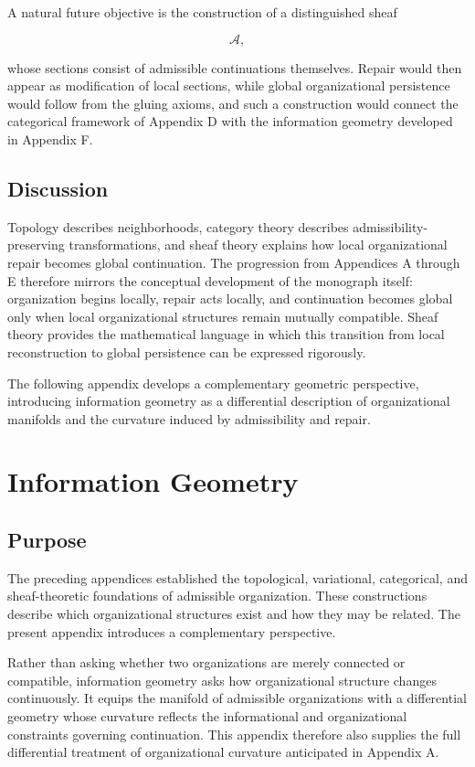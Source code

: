 \documentclass[11pt,oneside]{book}
\numberwithin{equation}{chapter}
\theoremstyle{definition}
\theoremstyle{plain}
\begin{document}
A natural future objective is the construction of a distinguished sheaf

\[
\mathcal A,
\]

whose sections consist of admissible continuations themselves. Repair would then appear as modification of local sections, while global organizational persistence would follow from the gluing axioms, and such a construction would connect the categorical framework of Appendix D with the information geometry developed in Appendix F.

\section{Discussion}

Topology describes neighborhoods, category theory describes admissibility-preserving transformations, and sheaf theory explains how local organizational repair becomes global continuation. The progression from Appendices A through E therefore mirrors the conceptual development of the monograph itself: organization begins locally, repair acts locally, and continuation becomes global only when local organizational structures remain mutually compatible. Sheaf theory provides the mathematical language in which this transition from local reconstruction to global persistence can be expressed rigorously.

The following appendix develops a complementary geometric perspective, introducing information geometry as a differential description of organizational manifolds and the curvature induced by admissibility and repair.

\chapter{Information Geometry}

\section{Purpose}

The preceding appendices established the topological, variational,
categorical, and sheaf-theoretic foundations of admissible organization.
These constructions describe which organizational structures exist and
how they may be related. The present appendix introduces a complementary
perspective.

Rather than asking whether two organizations are merely connected or
compatible, information geometry asks how organizational structure
changes continuously. It equips the manifold of admissible organizations
with a differential geometry whose curvature reflects the informational
and organizational constraints governing continuation. This appendix
therefore also supplies the full differential treatment of organizational
curvature anticipated in Appendix A.
\end{document}
